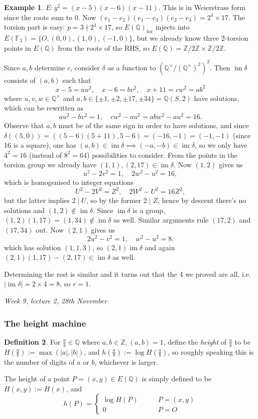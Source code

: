 \documentclass{article}
\newcommand{\F}{\mathbb{F}}
\newcommand{\Z}{\mathbb{Z}}
\newcommand{\Q}{\mathbb{Q}}
\newcommand{\im}{\operatorname{im}}
\theoremstyle{definition}
\newtheorem{defn}{Definition}[subsection]
\newtheorem{example}[defn]{Example}
\begin{document}
\begin{example}
$E:y^2=(x-5)(x-6)(x-11)$. This is in Weierstrass form since the roots sum to 0. Now $(e_1-e_2)(e_1-e_3)(e_2-e_3)=2^4\times 17$. The torsion part is easy: $p=3\nmid 2^4\times 17$, so $E(\Q)_{\operatorname{tor}}$ injects into $E(\F_3)=\{O,(0,0),(1,0),(-1,0)\}$, but we already know three 2-torsion points in $E(\Q)$ from the roots of the RHS, so $E(\Q)=\Z/2\Z\times\Z/2\Z$.

Since $a,b$ determine $c$, consider $\delta$ as a function to $\left(\Q^\times/\left(\Q^\times\right)^2\right)^2$. Then $\im\delta$ consists of $(a,b)$ such that
\[
x-5=au^2,\quad x-6=bv^2,\quad x+11=cw^2=ab^2
\]
where $u,v,w\in\Q^\times$ and $a,b\in\{\pm 1,\pm 2,\pm 17,\pm 34\}=\Q(S,2)$ have solutions, which can be rewritten as
\[
au^2-bv^2=1,\quad cw^2-au^2=abw^2-au^2=16.
\]
Observe that $a,b$ must be of the same sign in order to have solutions, and since $\delta((5,0))=((5-6)(5+11),5-6)=(-16,-1)=(-1,-1)$ (since 16 is a square), one has $(a,b)\in\im\delta\implies(-a,-b)\in\im\delta$, so we only have $4^2=16$ (instead of $8^2=64$) possibilities to consider. From the points in the torsion group we already have $(1,1),(2,17)\in\im\delta$. Now $(1,2)$ gives us
\[
u^2-2v^2=1,\quad 2w^2-u^2=16,
\]
which is homogenised to integer equations
\[
U^2-2V^2=Z^2,\quad 2W^2-U^2=16Z^2,
\]
but the latter implies $2\mid U$, so by the former $2\mid Z$, hence by descent there's no solutions and $(1,2)\notin\im\delta$. Since $\im\delta$ is a group, $(1,2)(1,17)=(1,34)\notin\im\delta$ as well. Similar arguments rule $(17,2)$ and $(17,34)$ out. Now $(2,1)$ gives us
\[
2u^2-v^2=1,\quad w^2-u^2=8.
\]
which has solution $(1,1,3)$, so $(2,1)\im\delta$ and again $(2,1)(1,17)-(2,17)\in\im\delta$ as well.

Determining the rest is similar and it turns out that the 4 we proved are all, i.e. $|\!\im\delta|=2\times 4=8$, so $r=1$.
\end{example}

\begin{flushright}
\textit{Week 9, lecture 2, 28th November}
\end{flushright}

\subsubsection{The height machine}
\begin{defn}
For $\frac{a}{b}\in\Q$ where $a,b\in\Z,(a,b)=1$, define the \textit{height} of $\frac{a}{b}$ to be $H\left(\frac{a}{b}\right):=\max(|a|,|b|)$, and $h\left(\frac{a}{b}\right):=\log H\left(\frac{a}{b}\right)$, so roughly speaking this is the number of digits of $a$ or $b$, whichever is larger.

The height of a point $P=(x,y)\in E(\Q)$ is simply defined to be $H(x,y):=H(x)$, and
\[
h(P)=\left\{\begin{aligned}
\log H(P)&\qquad P=(x,y) \\
0&\qquad P=O
\end{aligned} \right.
\]
\end{defn}
\end{document}
